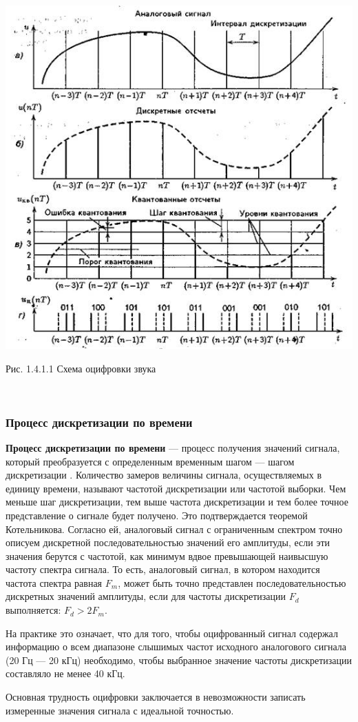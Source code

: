 \documentclass[a4paper]{report}
\begin{document}
~

\includegraphics[scale=0.8]{Analog_to_digi}
{\centering\par{Рис. 1.4.1.1 Схема оцифровки звука}\\}

~
\subsubsection{Процесс дискретизации по времени}
\textbf{Процесс дискретизации по времени} — процесс получения значений сигнала, который преобразуется с определенным временным шагом — шагом дискретизации . Количество замеров величины сигнала, осуществляемых в единицу времени, называют частотой дискретизации или частотой выборки. Чем меньше шаг дискретизации, тем выше частота дискретизации и тем более точное представление о сигнале будет получено.
Это подтверждается теоремой Котельникова. Согласно ей, аналоговый сигнал с ограниченным спектром точно описуем дискретной последовательностью значений его амплитуды, если эти значения берутся с частотой, как минимум вдвое превышающей наивысшую частоту спектра сигнала. То есть, аналоговый сигнал, в котором находится частота спектра равная $F_m$, может быть точно представлен последовательностью дискретных значений амплитуды, если для частоты дискретизации $F_d$ выполняется: $F_d>2F_m$.
\par На практике это означает, что для того, чтобы оцифрованный сигнал содержал информацию о всем диапазоне слышимых частот исходного аналогового сигнала (20 Гц — 20 кГц) необходимо, чтобы выбранное значение частоты дискретизации составляло не менее 40 кГц.
\par Основная трудность оцифровки заключается в невозможности записать измеренные значения сигнала с идеальной точностью.
\end{document}
